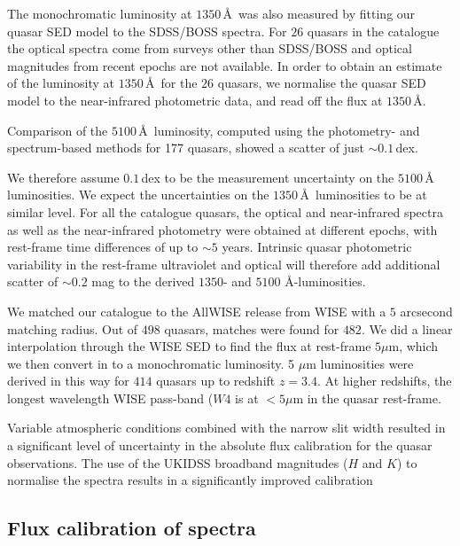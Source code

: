 The monochromatic luminosity at $1350$\,\AA\, was also measured by fitting our quasar SED model to the SDSS/BOSS spectra. 
For $26$ quasars in the catalogue the optical spectra come from surveys other than SDSS/BOSS and optical magnitudes from recent epochs are not available. 
In order to obtain an estimate of the luminosity at $1350$\,\AA\, for the $26$ quasars, we normalise the quasar SED model to the near-infrared photometric data, and read off the flux at $1350$\,\AA. 

Comparison of the $5100$\,\AA\, luminosity, computed using the photometry- and spectrum-based methods for 177 quasars, showed a scatter of just $\sim0.1$\,dex.

We therefore assume $0.1$\,dex to be the measurement uncertainty on the $5100$\,\AA\, luminosities.
We expect the uncertainties on the $1350$\,\AA\, luminosities to be at similar level.  
For all the catalogue quasars, the optical and near-infrared spectra as well as the near-infrared photometry were obtained at different epochs, with rest-frame time differences of up to $\sim5$ years. 
Intrinsic quasar photometric variability in the rest-frame ultraviolet and optical will therefore add additional scatter of $\sim0.2$ mag \citep[e.g.][]{macleod10} to the derived $1350$- and $5100$ \AA-luminosities.

We matched our catalogue to the AllWISE release from WISE with a $5$ arcsecond matching radius. 
Out of $498$ quasars, matches were found for $482$. 
We did a linear interpolation through the WISE SED to find the flux at rest-frame $5$$\mu$m, which we then convert in to a monochromatic luminosity. 
5 $\mu$m luminosities were derived in this way for $414$ quasars up to redshift $z=3.4$. 
At higher redshifts, the longest wavelength WISE pass-band ($W4$ is at $<5\mu$m in the quasar rest-frame.


Variable atmospheric conditions combined with the narrow slit width resulted in a significant level of uncertainty in the absolute flux calibration for the quasar observations. 
The use of the UKIDSS broadband magnitudes ($H$ and $K$) to normalise the spectra results in a significantly improved calibration 

\subsection{Flux calibration of spectra}


